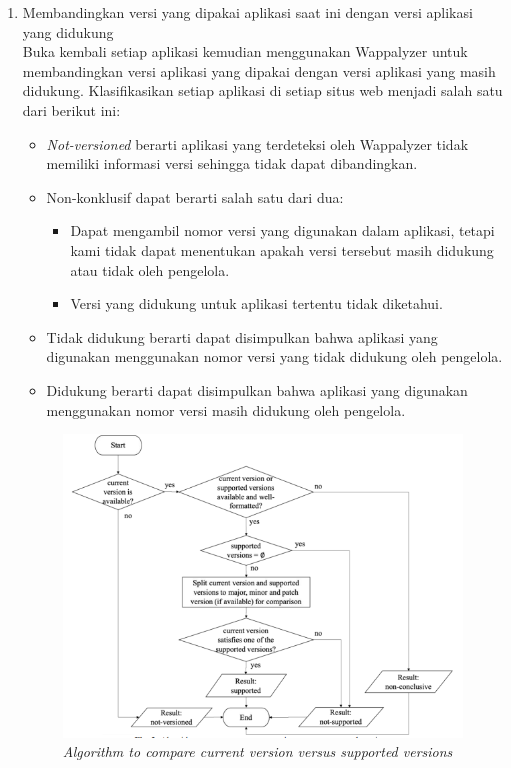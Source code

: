 \begin{enumerate}
	\item Membandingkan versi yang dipakai aplikasi saat ini dengan versi aplikasi yang didukung\\
	Buka kembali setiap aplikasi kemudian menggunakan Wappalyzer untuk membandingkan versi aplikasi yang dipakai dengan versi aplikasi yang masih didukung. Klasifikasikan setiap aplikasi di setiap situs web menjadi salah satu dari berikut ini:
	\begin{itemize}
		\item \textit{Not-versioned} berarti aplikasi yang terdeteksi oleh Wappalyzer tidak memiliki informasi versi sehingga tidak dapat dibandingkan.
		\item Non-konklusif dapat berarti salah satu dari dua:
		\begin{itemize}
			\item Dapat mengambil nomor versi yang digunakan dalam aplikasi, tetapi kami tidak dapat menentukan apakah versi tersebut masih didukung atau tidak oleh pengelola.
			\item Versi yang didukung untuk aplikasi tertentu tidak diketahui.
		\end{itemize}
		\item Tidak didukung berarti dapat disimpulkan bahwa aplikasi yang digunakan menggunakan nomor versi yang tidak didukung oleh pengelola.
		\item Didukung berarti dapat disimpulkan bahwa aplikasi yang digunakan menggunakan nomor versi masih didukung oleh pengelola.
	\end{itemize}
	\begin{figure}[H]
		\centering  
		\includegraphics[scale=0.9]{Gambar/compare_version.PNG}  
		\caption{\textit{ Algorithm to compare current version versus supported versions}} 
		\label{fig:apr} 
	\end{figure}
\end{enumerate}


